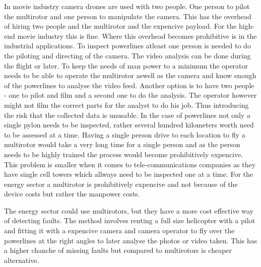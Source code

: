 \documentclass[12pt,oneside]{reedthesis}
\theoremstyle{definition}
\theoremstyle{definition}
\theoremstyle{definition}
\theoremstyle{remark}
\begin{document}
In movie industry camera drones are used with two people. One person to
pilot the multirotor and one person to manipulate the camera. This has
the overhead of hiring two people and the multirotor and the expencive
payload. For the high-end movie industry this is fine. Where this
overhead becomes prohibitive is in the industrial applications. To
inspect powerlines atleast one person is needed to do the piloting and
directing of the camera. The video analysis can be done during the
flight or later. To keep the needs of man power to a minimum the
operator needs to be able to operate the multirotor aswell as the camera
and know enough of the powerlines to analyse the video feed. Another
option is to have two people - one to pilot and film and a second one to
do the analysis. The operator however might not film the correct parts
for the analyst to do his job. Thus introducing the risk that the
collected data is unusable. In the case of powerlines not only a single
pylon needs to be inspected, rather several hundred kilometers worth
need to be assessed at a time. Having a single person drive to each
location to fly a multirotor would take a very long time for a single
person and as the person needs to be highly trained the process would
become prohibitively expencive. This problem is smaller when it comes to
tele-communications companies as they have single cell towers which
allways need to be inspected one at a time. For the energy sector a
multirotor is prohibitively expencive and not because of the device
costs but rather the manpower costs.

The energy sector could use multirotors, but they have a more cost
effective way of detecting faults. The method involves renting a full
size helicopter with a pilot and fitting it with a expencive camera and
camera operator to fly over the powerlines at the right angles to later
analyse the photos or video taken. This has a higher chanche of missing
faults but compared to multirotors is cheaper alternative.
\end{document}
